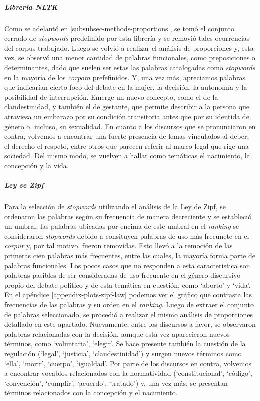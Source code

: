\subparagraph{Librer\'ia NLTK}
Como se adelant\'o en \ref{subsubsec-methods-proportions}, se tom\'o el conjunto cerrado de
\textit{stopwords} predefinido por esta librer\'ia y se removi\'o tales ocurrencias
del corpus trabajado.
Luego se volvi\'o a realizar el an\'alisis de proporciones y, esta
vez, se observ\'o una menor cantidad de palabras funcionales,
como preposiciones o determinantes, dado que suelen ser estas
las palabras catalogadas como \textit{stopwords} en la mayor\'ia de
los \textit{corpora} prefefinidos. Y, una vez m\'as, apreciamos palabras que indicar\'ian
cierto foco del debate en la mujer, la decisi\'on, la autonom\'ia y la posibilidad de
interrupci\'on. Emerge un nuevo concepto, como el de la clandestinidad, y tambi\'en
el de gestante, que permite describir a la persona que atraviesa un embarazo por
su condici\'on transitoria antes que por su identida de g\'enero o, incluso, su
sexualidad.
En cuanto a los discursos que se pronunciaron en contra, volvemos a
encontrar una fuerte presencia de lemas vinculados al deber, el derecho
el respeto, entre otros que parecen referir al marco legal que rige una
sociedad. Del mismo modo, se vuelven a hallar como tem\'aticas el nacimiento,
la concepci\'on y la vida.

\subparagraph{Ley se Zipf}
Para la selecci\'on de \textit{stopwords} utilizando el an\'alisis de la Ley de Zipf,
se ordenaron las palabras seg\'un su frecuencia de manera decreciente y se estableci\'o
un umbral: las palabras ubicadas por encima de este umbral en el \textit{ranking}
se consideraron \textit{stopwords} debido a consituyen palabras de uso m\'as
frecunete en el \textit{corpur} y, por tal motivo, fueron removidas.
Esto llev\'o a la remoci\'on de las primeras cien palabras m\'as frecuentes, entre 
las cuales, la mayor\'ia forma parte de palabras funcionales.
Los pocos casos que no responden a esta caracter\'istica son palabras pasibles de
ser consideradas de uso frecuente en el g\'enero discursivo propio del debate pol\'itico
y de esta tem\'atica en cuesti\'on, como `aborto' y `vida'.
En el ap\'endice \ref{appendix-plots-zipf-law} podemos ver el gr\'afico que contrasta
las frecuencias de las palabras y su orden en el \textit{ranking}.
Luego de extraer el conjunto de palabras seleccionado, se procedi\'o a realizar el
mismo an\'alisis de proporciones detallado en este apartado. Nuevamente, entre
los discursos a favor, se observaron palabras relacionadas con la decisi\'on, aunque
esta vez aparecieron nuevos t\'erminos, como `voluntaria', `elegir'. Se hace presente
tambi\'en la cuesti\'on de la regulaci\'on (`legal', `justicia', `clandestinidad') y
surgen nuevos t\'erminos como `ella', `morir', `cuerpo', `igualdad'.
Por parte de los discursos en contra, volvemos a encontrar vocablos relacionados
con la normatividad (`constitucional', `c\'odigo', `convenci\'on', `cumplir', 
`acuerdo', `tratado') y, una vez m\'as, se presentan t\'erminos relacionados
con la concepci\'on y el nacimiento.

